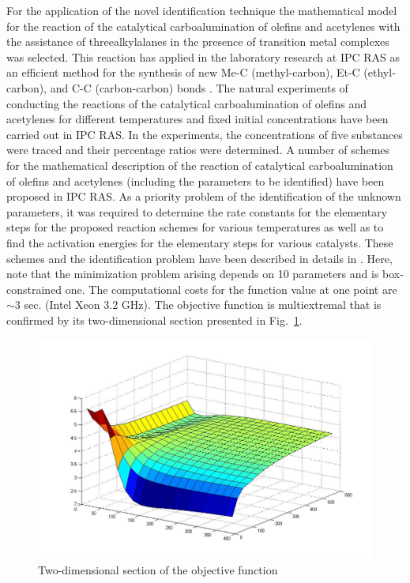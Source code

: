For the application of the novel identification technique the mathematical model for the reaction of the catalytical carboalumination of olefins and acetylenes with the assistance of threealkylalanes in the presence of transition metal complexes was selected. This reaction has applied in the laboratory research at IPC RAS as an efficient method for the synthesis of new Me-C (methyl-carbon), Et-C (ethyl-carbon), and C-C (carbon-carbon) bonds \cite{8_Parfenova2009}. The natural experiments of conducting the reactions of the catalytical carboalumination of olefins and acetylenes for different temperatures and fixed initial concentrations have been carried out in IPC RAS. In the experiments, the concentrations of five substances were traced and their percentage ratios were determined. A number of schemes for the mathematical description of the reaction of catalytical carboalumination of olefins and acetylenes (including the parameters to be identified) have been proposed in IPC RAS. As a priority problem of the identification of the unknown parameters, it was required to determine the rate constants for the elementary steps for the proposed reaction schemes for various temperatures as well as to find the activation energies for the elementary steps for various catalysts. These schemes and the identification problem have been described in details in \cite{8_Gubaidullin2011}. Here, note that the minimization problem arising depends on 10 parameters and is box-constrained one. The computational costs for the function value at one point are $\sim 3$ sec. (Intel Xeon 3.2 GHz). The objective function is  multiextremal that is confirmed by its two-dimensional section presented in Fig.~\ref{8_fig_5}. 

\begin{figure}[t]
\includegraphics[width=0.8\linewidth]{figures/8_5.png}
\caption{Two-dimensional section of the objective function}
\label{8_fig_5}     
\end{figure}

